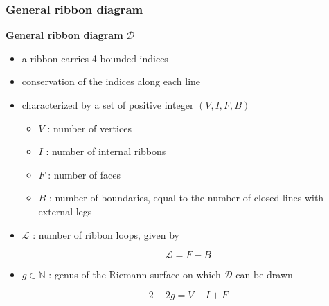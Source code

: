 \documentclass[9pt]{beamer}
\begin{document}
\begin{frame}

\frametitle{General ribbon diagram}

\textbf{General ribbon diagram} $\mathcal{D}$

\begin{center}
\end{center}


\begin{itemize}
\item a ribbon carries 4 bounded indices

\item conservation of the indices along each line

\item characterized by a set of positive integer $(V,I,F,B)$

\begin{itemize}
\item $V$ : number of vertices

\item $I$ : number of internal ribbons

\item $F$ : number of faces

\item $B$ : number of boundaries, equal to the number of closed lines with external legs

\end{itemize}

\item $\mathcal{L}$ : number of ribbon loops, given by

\begin{equation*}
\mathcal{L}=F-B
\end{equation*}

\item $g\in\mathbb{N}$ : genus of the Riemann surface on which $\mathcal{D}$ can be drawn

\begin{equation*}
2-2g=V-I+F 
\end{equation*}


\end{itemize}

\end{frame}
\end{document}
